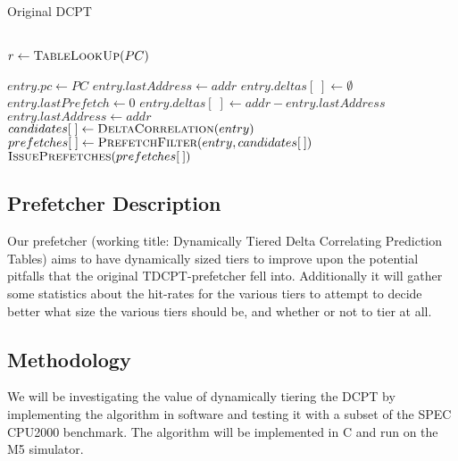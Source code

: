 \begin{algorithm}
\footnotesize
\caption{Original DCPT}
  \begin{algorithmic}[1]
     \\
      \State $r \gets \Call{TableLookUp}{PC}$

        \State $entry.pc \gets PC$
        \State $entry.lastAddress \gets addr$
        \State $entry.deltas[\;] \gets \emptyset$
        \State $entry.lastPrefetch \gets 0$
        \State $entry.deltas[\;] \gets addr - entry.lastAddress$
        \State $entry.lastAddress \gets addr$ \\

        \State $candidates[\;] \gets \Call{DeltaCorrelation}{entry}$
        \State $prefetches[\;] \gets \Call{PrefetchFilter}{entry, candidates[\:]}$
        \State $\Call{IssuePrefetches}{prefetches[\:]}$
      \EndIf
    \EndProcedure
  \end{algorithmic}
\end{algorithm}

\subsection{Prefetcher Description}

Our prefetcher (working title: Dynamically Tiered Delta Correlating Prediction
Tables) aims to have dynamically sized tiers to improve upon the potential
pitfalls that the original TDCPT-prefetcher fell into. Additionally it will
gather some statistics about the hit-rates for the various tiers to attempt to
decide better what size the various tiers should be, and whether or not to tier
at all.


\subsection{Methodology}

We will be investigating the value of dynamically tiering the DCPT by
implementing the algorithm in software and testing it with a subset of the SPEC
CPU2000 benchmark.  The algorithm will be implemented in C and run on the M5
simulator.
